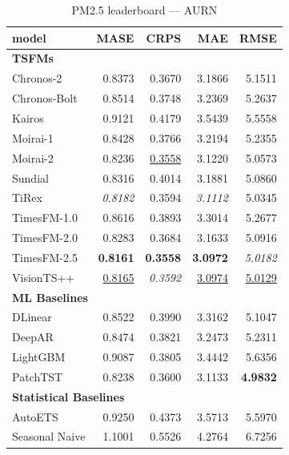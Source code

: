 \begin{table}[H]
\caption{PM2.5 leaderboard --- AURN}
\centering
\begin{small}
\begin{tabular}{lrrrr}
\toprule
model & MASE & CRPS & MAE & RMSE \\
\midrule
\multicolumn{5}{l}{\textbf{TSFMs}} \\
Chronos-2 & 0.8373 & 0.3670 & 3.1866 & 5.1511 \\
Chronos-Bolt & 0.8514 & 0.3748 & 3.2369 & 5.2637 \\
Kairos & 0.9121 & 0.4179 & 3.5439 & 5.5558 \\
Moirai-1 & 0.8428 & 0.3766 & 3.2194 & 5.2355 \\
Moirai-2 & 0.8236 & \underline{0.3558} & 3.1220 & 5.0573 \\
Sundial & 0.8316 & 0.4014 & 3.1881 & 5.0860 \\
TiRex & \textit{0.8182} & 0.3594 & \textit{3.1112} & 5.0345 \\
TimesFM-1.0 & 0.8616 & 0.3893 & 3.3014 & 5.2677 \\
TimesFM-2.0 & 0.8283 & 0.3684 & 3.1633 & 5.0916 \\
TimesFM-2.5 & \textbf{0.8161} & \textbf{0.3558} & \textbf{3.0972} & \textit{5.0182} \\
VisionTS++ & \underline{0.8165} & \textit{0.3592} & \underline{3.0974} & \underline{5.0129} \\
\midrule
\multicolumn{5}{l}{\textbf{ML Baselines}} \\
DLinear & 0.8522 & 0.3990 & 3.3162 & 5.1047 \\
DeepAR & 0.8474 & 0.3821 & 3.2473 & 5.2311 \\
LightGBM & 0.9087 & 0.3805 & 3.4442 & 5.6356 \\
PatchTST & 0.8238 & 0.3600 & 3.1133 & \textbf{4.9832} \\
\midrule
\multicolumn{5}{l}{\textbf{Statistical Baselines}} \\
AutoETS & 0.9250 & 0.4373 & 3.5713 & 5.5970 \\
Seasonal Naive & 1.1001 & 0.5526 & 4.2764 & 6.7256 \\
\bottomrule
\end{tabular}
\end{small}
\end{table}